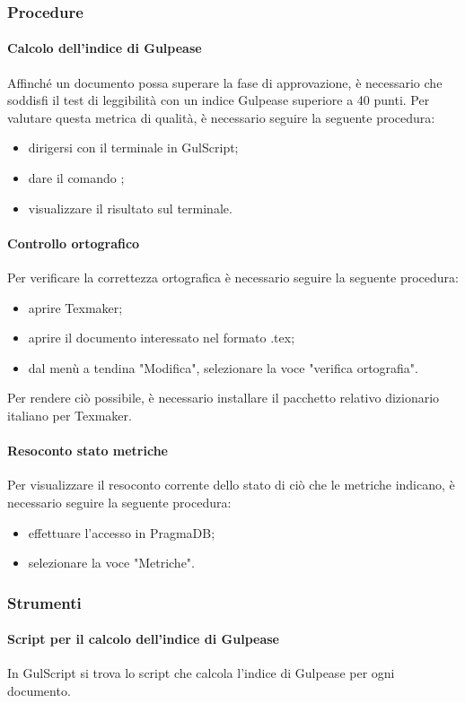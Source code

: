 \subsubsection{Procedure}
\paragraph{Calcolo dell'indice di Gulpease}
Affinché un documento possa superare la fase di approvazione, è necessario che soddisfi il test di leggibilità con un indice Gulpease superiore a 40 punti. Per valutare questa metrica di qualità, è necessario seguire la seguente procedura:
\begin{itemize}
	\item dirigersi con il terminale in GulScript{};
	\item dare il comando ;
	\item visualizzare il risultato sul terminale.
\end{itemize}
\paragraph{Controllo ortografico}
Per verificare la correttezza ortografica è necessario seguire la seguente procedura:
\begin{itemize}
	\item aprire Texmaker;
	\item aprire il documento interessato nel formato .tex;
	\item dal menù a tendina "Modifica", selezionare la voce "verifica ortografia".
\end{itemize}
Per rendere ciò possibile, è necessario installare il pacchetto relativo dizionario italiano per Texmaker.
\paragraph{Resoconto stato metriche}
Per visualizzare il resoconto corrente dello stato di ciò che le metriche indicano, è necessario seguire la seguente procedura:
\begin{itemize}
	\item effettuare l'accesso in PragmaDB;
	\item selezionare la voce "Metriche".
\end{itemize}
\subsubsection{Strumenti}
\paragraph{Script per il calcolo dell'indice di Gulpease}
In GulScript{} si trova lo script che calcola l'indice di Gulpease per ogni documento.
